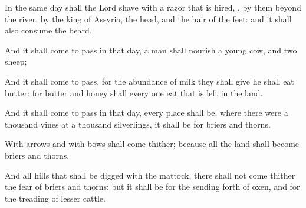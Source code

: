 {In the same
day shall the
Lord
shave with a
razor that is
hired,
{}, by them
beyond the
river, by the
king of
Assyria, the
head, and the
hair of the
feet: and it shall also
consume the
beard.

And it shall come to pass in that
day,
{} a
man shall
nourish a
young
cow, and
two
sheep;

And it shall come to pass, for the
abundance of
milk
{} they shall
give he shall
eat
butter: for
butter and
honey shall every one
eat that is
left
in the
land.

And it shall come to pass in that
day,
{} every
place shall be, where there were a
thousand
vines at a
thousand
silverlings, it shall
{} be for
briers and
thorns.

With
arrows and with
bows shall
{}
come thither; because all the
land shall become
briers and
thorns.

And
{} all
hills that shall be
digged with the
mattock, there shall not come
thither the
fear of
briers and
thorns: but it shall be for the sending
forth of
oxen, and for the
treading of lesser
cattle.




\par }
